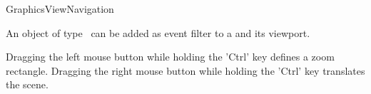 \begin{ccRefClass}[Qt::]{GraphicsViewNavigation}

\ccDefinition
An object of type \ccRefName\ can be added as event filter to a  and its viewport.

Dragging the left mouse button while holding the 'Ctrl' key defines a zoom rectangle.
Dragging the right mouse button while holding the 'Ctrl' key translates the scene.




\ccOperations



\end{ccRefClass}







